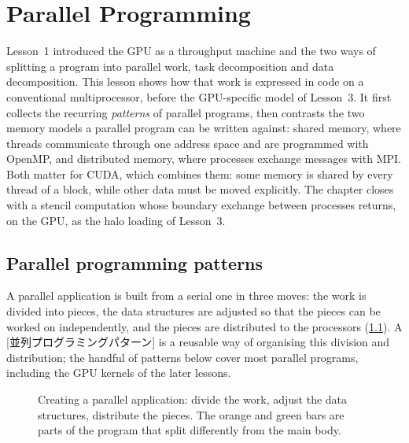 \documentclass[../main.tex]{subfiles}
\begin{document}
\chapter{Parallel Programming}

Lesson~1 introduced the GPU as a throughput machine and the two ways of
splitting a program into parallel work, task decomposition and data
decomposition.  This lesson shows how that work is expressed in code on a
conventional multiprocessor, before the GPU-specific model of Lesson~3.
It first collects the recurring \emph{patterns} of parallel programs, then
contrasts the two memory models a parallel program can be written against:
shared memory, where threads communicate through one address space and are
programmed with OpenMP, and distributed memory, where processes exchange
messages with MPI.  Both matter for CUDA, which combines them: some memory
is shared by every thread of a block, while other data must be moved
explicitly.  The chapter closes with a stencil computation whose boundary
exchange between processes returns, on the GPU, as the halo loading of
Lesson~3.

\section{Parallel programming patterns}
\label{sec:l02-patterns}

A parallel application is built from a serial one in three moves: the work
is divided into pieces, the data structures are adjusted so that the pieces
can be worked on independently, and the pieces are distributed to the
processors (\cref{fig:l02-parallel-app}).  A [並列プログラミングパターン]
is a reusable way of organising this division and distribution; the handful
of patterns below cover most parallel programs, including the GPU kernels
of the later lessons.

\begin{figure}[tb]
  \centering
  
  \caption{Creating a parallel application: divide the work, adjust the
    data structures, distribute the pieces.  The orange and green bars are
    parts of the program that split differently from the main body.}
  \label{fig:l02-parallel-app}
\end{figure}
\end{document}
